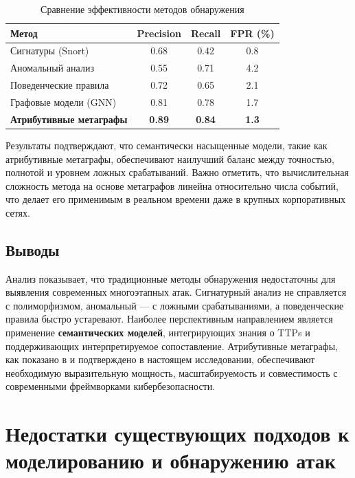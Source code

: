 \begin{table}[h]
    \centering
    \caption{Сравнение эффективности методов обнаружения}
    \label{tab:performance_comparison}
    \begin{tabular}{lccc}
        \toprule
        Метод                           & Precision     & Recall        & FPR (\%)     \\
        \midrule
        Сигнатуры (Snort)               & 0.68          & 0.42          & 0.8          \\
        Аномальный анализ               & 0.55          & 0.71          & 4.2          \\
        Поведенческие правила           & 0.72          & 0.65          & 2.1          \\
        Графовые модели (GNN)           & 0.81          & 0.78          & 1.7          \\
        \textbf{Атрибутивные метаграфы} & \textbf{0.89} & \textbf{0.84} & \textbf{1.3} \\
        \bottomrule
    \end{tabular}
\end{table}

Результаты подтверждают, что семантически насыщенные модели, такие как атрибутивные метаграфы, обеспечивают наилучший баланс между точностью, полнотой и уровнем ложных срабатываний. Важно отметить, что вычислительная сложность метода на основе метаграфов линейна относительно числа событий, что делает его применимым в реальном времени даже в крупных корпоративных сетях.

\subsection{Выводы}

Анализ показывает, что традиционные методы обнаружения недостаточны для выявления современных многоэтапных атак. Сигнатурный анализ не справляется с полиморфизмом, аномальный — с ложными срабатываниями, а поведенческие правила быстро устаревают. Наиболее перспективным направлением является применение \textbf{семантических моделей}, интегрирующих знания о TTPs и поддерживающих интерпретируемое сопоставление. Атрибутивные метаграфы, как показано в \cite{Latypov2020} и подтверждено в настоящем исследовании, обеспечивают необходимую выразительную мощность, масштабируемость и совместимость с современными фреймворками кибербезопасности.

\section{Недостатки существующих подходов к моделированию и обнаружению атак}\label{sec:ch1/sec3}

